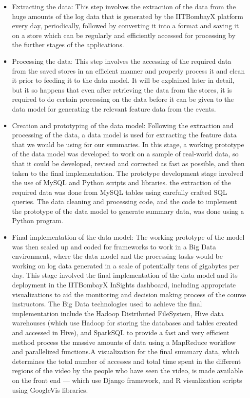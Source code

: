 \documentclass[16pt]{report}
\begin{document}
\begin{itemize}
\item Extracting the data: This step involves the extraction of the data from the huge amounts of the log data that is generated by the IITBombayX platform every day, periodically, followed by converting it into a format and saving it on a store which can be regularly and efficiently accessed for processing by the further stages of the applications.

\item Processing the data: This step involves the accessing of the required data from the saved stores in an efficient manner and properly process it and clean it prior to feeding it to the data model. It will be explained later in detail, but it so happens that even after retrieving the data from the stores, it is required to do certain processing on the data before it can be given to the data model for generating the relevant feature data from the events.

\item Creation and prototyping of the data model: Following the extraction and processing of the data, a data model is used for extracting the feature data that we would be using for our summaries. In this stage, a working prototype of the data model was developed to work on a sample of real-world data, so that it could be developed, revised and corrected as fast as possible, and then taken to the final implementation. The prototype development stage involved the use of MySQL and Python scripts and libraries. the extraction of the required data was done from MySQL tables using carefully crafted SQL queries. The data cleaning and processing code, and the code to implement the prototype of the data model to generate summary data, was done using a Python program.

\item Final implementation of the data model: The working prototype of the model was then scaled up and coded for frameworks to work in a Big Data environment, where the data model and the processing tasks would be working on log data generated in a scale of potentially tens of gigabytes per day. This stage involved the final implementation of the data model and its deployment in the IITBombayX InSights dashboard, including appropriate visualizations to aid the monitoring and decision making process of the course instructors. The Big Data technologies used to achieve the final implementation include the Hadoop Distributed FileSystem, Hive data warehouses (which use Hadoop for storing the databases and tables created and accessed in Hive), and SparkSQL to provide a fast and very efficient method process the massive amounts of data using a MapReduce workflow and parallelized functions.A visualization for the final summary data, which determines the total number of accesses and total time spent in the different regions of the video by the people who have seen the video, is made available on the front end --- which use Django framework, and R visualization scripts using GoogleVis libraries.

\end{itemize}
\end{document}
